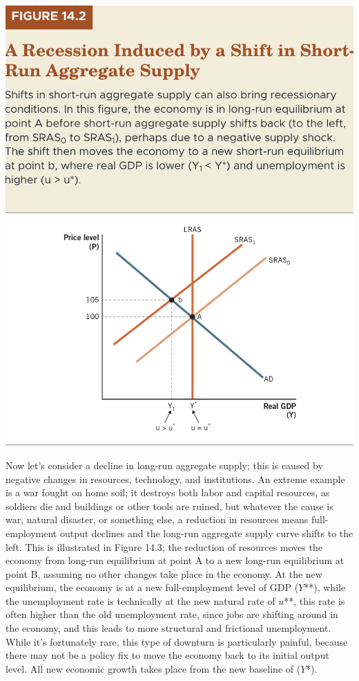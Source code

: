 \documentclass[11pt]{article} %
\begin{document}
\begin{center}
\includegraphics[scale=0.5]{images/Figure 14.2.png}
\end{center}
Now let's consider a decline in long-run aggregate supply; this is caused by negative changes in resources, technology, and institutions. An extreme example is a war fought on home soil; it destroys both labor and capital resources, as soldiers die and buildings or other tools are ruined, but whatever the cause is war, natural disaster, or something else, a reduction in resources means full-employment output declines and the long-run aggregate supply curve shifts to the left. This is illustrated in Figure 14.3; the reduction of resources moves the economy from long-run equilibrium at point A to a new long-run equilibrium at point B, assuming no other changes take place in the economy. At the new equilibrium, the economy is at a new full-employment level of GDP (\(Y\)**), while the unemployment rate is technically at the new natural rate of \(u\)**, this rate is often higher than the old unemployment rate, since jobs are shifting around in the economy, and this leads to more structural and frictional unemployment. While it's fortunately rare, this type of downturn is particularly painful, because there may not be a policy fix to move the economy back to its initial output level. All new economic growth takes place from the new baseline of (\(Y\)*).
\end{document}
